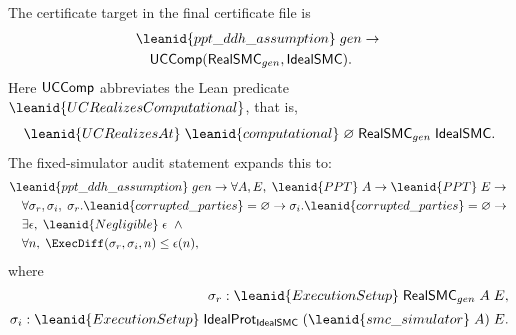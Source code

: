 \begin{definition}
The certificate target in the final certificate file is
\[
\begin{aligned}
&\leanid{ppt\_ddh\_assumption}\;gen \to {}\\
&\quad
  \UCComp(\RealSMC_{gen},\IdealSMC).
\end{aligned}
\]
Here \(\mathsf{UCComp}\) abbreviates the Lean predicate
\(\leanid{UCRealizesComputational}\), that is,
\[
  \leanid{UCRealizesAt}\;\leanid{computational}\;\varnothing\;
    \RealSMC_{gen}\;\IdealSMC .
\]
The fixed-simulator audit statement expands this to:
\[
\begin{aligned}
&\leanid{ppt\_ddh\_assumption}\;gen \to
  \forall A,E,\; \leanid{PPT}\;A \to \leanid{PPT}\;E \to {}\\
&\quad
  \forall \sigma_r,\sigma_i,\;
  \sigma_r.\leanid{corrupted\_parties}=\varnothing \to
  \sigma_i.\leanid{corrupted\_parties}=\varnothing \to {}\\
&\quad
  \exists \epsilon,\;
    \leanid{Negligible}\;\epsilon \ \land {}\\
&\quad
  \forall n,\;
    \ExecDiff(\sigma_r,\sigma_i,n)
    \le \epsilon(n),
\end{aligned}
\]
where
\[
\begin{aligned}
\sigma_r :
  \leanid{ExecutionSetup}\;
    \RealSMC_{gen}\;A\;E,\\[0.2em]
\sigma_i :
  \leanid{ExecutionSetup}\;
    \IdealProt_{\IdealSMC}\;
    (\leanid{smc\_simulator}\;A)\;E .
\end{aligned}
\]
\end{definition}

